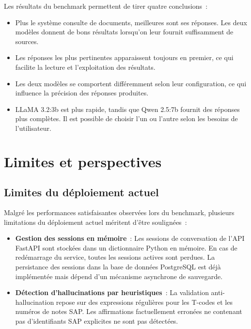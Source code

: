 Les résultats du benchmark permettent de tirer quatre conclusions~:

\begin{itemize}[leftmargin=2em]
  \item Plus le système consulte de documents, meilleures sont ses réponses. Les deux modèles donnent de bons résultats lorsqu'on leur fournit suffisamment de sources.

  \item Les réponses les plus pertinentes apparaissent toujours en premier, ce qui facilite la lecture et l'exploitation des résultats.

  \item Les deux modèles se comportent différemment selon leur configuration, ce qui influence la précision des réponses produites.

  \item LLaMA 3.2:3b est plus rapide, tandis que Qwen 2.5:7b fournit des réponses plus complètes. Il est possible de choisir l'un ou l'autre selon les besoins de l'utilisateur.
\end{itemize}

\section{Limites et perspectives}

\subsection{Limites du déploiement actuel}

Malgré les performances satisfaisantes observées lors du benchmark, plusieurs limitations du déploiement actuel méritent d'être soulignées~:

\begin{itemize}[leftmargin=2em]
 
  \item \textbf{Gestion des sessions en mémoire}~: Les sessions de conversation de l'API FastAPI sont stockées dans un dictionnaire Python en mémoire. En cas de redémarrage du service, toutes les sessions actives sont perdues. La persistance des sessions dans la base de données PostgreSQL est déjà implémentée mais dépend d'un mécanisme asynchrone de sauvegarde.

  \item \textbf{Détection d'hallucinations par heuristiques}~: La validation anti-hallucination repose sur des expressions régulières pour les T-codes et les numéros de notes SAP. Les affirmations factuellement erronées ne contenant pas d'identifiants SAP explicites ne sont pas détectées.
\end{itemize}


